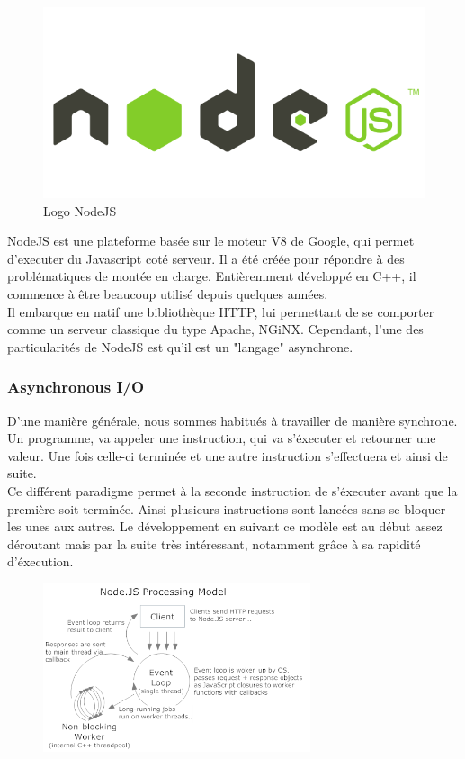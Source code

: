 \documentclass{report}
\newcommand{\jumpOne}{\\[1\baselineskip]}
\begin{document}
\begin{minipage}{0.5\textwidth}
	\begin{figure}[H]
		\centering
		\includegraphics[width=1\textwidth]{assets/nodejs.png}
	\caption{Logo NodeJS}
\end{figure}
\end{minipage} 
\hfill
\begin{minipage}{0.45\textwidth}
	NodeJS est une plateforme basée sur le \gls{moteur V8} de Google, qui permet d'executer du Javascript coté serveur. Il a été créée pour répondre à des problématiques de montée en charge. Entièremment développé en C++, il commence à être beaucoup utilisé depuis quelques années.  
	\jumpOne
	Il embarque en natif une bibliothèque \gls{HTTP}, lui permettant de se comporter comme un serveur classique du type Apache, \gls{NGiNX}. Cependant, l'une des particularités de NodeJS est qu'il est un "langage" \gls{asynchrone}. 
\end{minipage}
\subsubsection{Asynchronous I/O}
D'une manière générale, nous sommes habitués à travailler de manière synchrone. Un programme, va appeler une instruction, qui va s'éxecuter et retourner une valeur. 
Une fois celle-ci terminée et une autre instruction s'effectuera et ainsi de suite. 
\jumpOne
Ce différent paradigme permet à la seconde instruction de s'éxecuter avant que la première soit terminée. Ainsi plusieurs instructions sont lancées sans se bloquer les unes aux autres. Le développement en suivant ce modèle est au début assez déroutant mais par la suite très intéressant, notamment grâce à sa rapidité d'éxecution.
\jumpOne

\begin{figure}[h!]
	\centering
	\includegraphics[width=0.7\textwidth]{assets/nonblockingio.png}
\end{figure}
\end{document}
